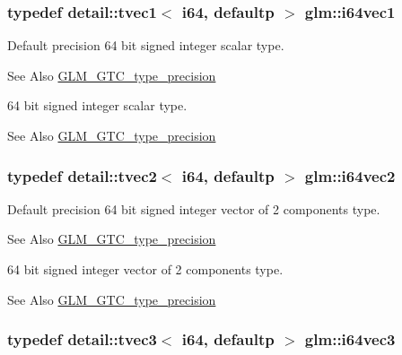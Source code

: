 \hypertarget{group__gtc__type__precision_ga8bc234da7e4a6436e01241f439fc7ddd}{
\subsubsection[{i64vec1}]{\setlength{\rightskip}{0pt plus 5cm}typedef detail\-::tvec1$<$ i64, defaultp $>$ {\bf glm\-::i64vec1}}}\label{group__gtc__type__precision_ga8bc234da7e4a6436e01241f439fc7ddd}
Default precision 64 bit signed integer scalar type. \begin{DoxySeeAlso}{See Also}
\hyperlink{group__gtc__type__precision}{G\-L\-M\-\_\-\-G\-T\-C\-\_\-type\-\_\-precision}
\end{DoxySeeAlso}
64 bit signed integer scalar type. \begin{DoxySeeAlso}{See Also}
\hyperlink{group__gtc__type__precision}{G\-L\-M\-\_\-\-G\-T\-C\-\_\-type\-\_\-precision} 
\end{DoxySeeAlso}
\hypertarget{group__gtc__type__precision_ga75461c98baf3e3913566550bd9d8d17f}{
\subsubsection[{i64vec2}]{\setlength{\rightskip}{0pt plus 5cm}typedef detail\-::tvec2$<$ i64, defaultp $>$ {\bf glm\-::i64vec2}}}\label{group__gtc__type__precision_ga75461c98baf3e3913566550bd9d8d17f}
Default precision 64 bit signed integer vector of 2 components type. \begin{DoxySeeAlso}{See Also}
\hyperlink{group__gtc__type__precision}{G\-L\-M\-\_\-\-G\-T\-C\-\_\-type\-\_\-precision}
\end{DoxySeeAlso}
64 bit signed integer vector of 2 components type. \begin{DoxySeeAlso}{See Also}
\hyperlink{group__gtc__type__precision}{G\-L\-M\-\_\-\-G\-T\-C\-\_\-type\-\_\-precision} 
\end{DoxySeeAlso}
\hypertarget{group__gtc__type__precision_gab6eefcd7eb24e4142ed23dc1e87163a6}{
\subsubsection[{i64vec3}]{\setlength{\rightskip}{0pt plus 5cm}typedef detail\-::tvec3$<$ i64, defaultp $>$ {\bf glm\-::i64vec3}}}\label{group__gtc__type__precision_gab6eefcd7eb24e4142ed23dc1e87163a6}

